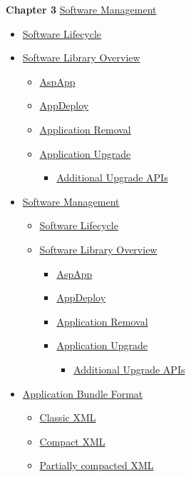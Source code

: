 {\bf Chapter 3} \hyperlink{ardguide_sec_3}{Software Management}\begin{itemize}
\item \hyperlink{ardguide_sec_3_1}{Software Lifecycle}\item \hyperlink{ardguide_sec_3_2}{Software Library Overview}\begin{itemize}
\item \hyperlink{ardguide_sec_3_2_ardguide_sec_3_2_1}{AspApp}\item \hyperlink{ardguide_sec_3_2_ardguide_sec_3_2_2}{AppDeploy}\item \hyperlink{ardguide_sec_3_2_ardguide_sec_3_2_3}{Application Removal}\item \hyperlink{ardguide_sec_3_2_ardguide_sec_3_2_4}{Application Upgrade}\begin{itemize}
\item \hyperlink{ardguide_sec_3_2_ardguide_sec_3_2_4_1}{Additional Upgrade APIs}\end{itemize}
\end{itemize}
\item \hyperlink{ardguide_sec_3_3}{Software Management}\begin{itemize}
\item \hyperlink{ardguide_sec_3_3_ardguide_sec_3_3_1}{Software Lifecycle}\item \hyperlink{ardguide_sec_3_3_ardguide_sec_3_3_2}{Software Library Overview}\begin{itemize}
\item \hyperlink{ardguide_sec_3_3_ardguide_sec_3_3_2_1}{AspApp}\item \hyperlink{ardguide_sec_3_3_ardguide_sec_3_3_2_2}{AppDeploy}\item \hyperlink{ardguide_sec_3_3_ardguide_sec_3_3_2_3}{Application Removal}\item \hyperlink{ardguide_sec_3_3_ardguide_sec_3_3_2_4}{Application Upgrade}\begin{itemize}
\item \hyperlink{ardguide_sec_3_3_ardguide_sec_3_3_2_4_1}{Additional Upgrade APIs}\end{itemize}
\end{itemize}
\end{itemize}
\item \hyperlink{ardguide_sec_3_4}{Application Bundle Format}\begin{itemize}
\item \hyperlink{ardguide_sec_3_4_ardguide_sec_3_4_0_1}{Classic XML}\item \hyperlink{ardguide_sec_3_4_ardguide_sec_3_4_0_2}{Compact XML}\item \hyperlink{ardguide_sec_3_4_ardguide_sec_3_4_0_3}{Partially compacted XML}\end{itemize}
\end{itemize}


